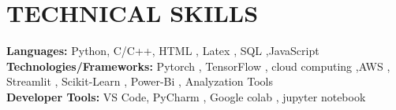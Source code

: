 \documentclass[letterpaper,11pt]{article}
\makeatletter
\newcommand{\resumeItem}[1]{
  \item\small{
    {#1 \vspace{-2pt}}
  }
}
\newcommand{\resumeSubheading}[4]{
  \vspace{-2pt}\item
    \begin{tabular*}{1.0\textwidth}[t]{l@{\extracolsep{\fill}}r}
      \textbf{\large#1} & \textbf{\small #2} \\
      \textit{\large#3} & \textit{\small #4} \\
      
    \end{tabular*}\vspace{-7pt}
}
\newcommand{\resumeSubHeadingListStart}{\begin{itemize}[leftmargin=0.0in, label={}]}
\newcommand{\resumeSubHeadingListEnd}{\end{itemize}}
\newcommand{\resumeItemListStart}{\begin{itemize}}
\newcommand{\resumeItemListEnd}{\end{itemize}\vspace{-5pt}}
\makeatother
\begin{document}
  
\section{TECHNICAL SKILLS}
 \begin{itemize}[leftmargin=0.15in, label={}]
    \small{\item{
     \textbf{\normalsize{Languages:}}{  \normalsize{Python, C/C++, HTML , Latex , SQL ,JavaScript}} \\
     \textbf{\normalsize{Technologies/Frameworks:}}{  \normalsize{Pytorch , TensorFlow , cloud computing ,AWS , Streamlit , Scikit-Learn , Power-Bi , Analyzation Tools}} \\
     \textbf{\normalsize{Developer Tools:}}{  \normalsize{VS Code, PyCharm , Google colab , jupyter notebook }} \\
    }}
 \end{itemize}
 \vspace{-15pt}


 
\end{document}
